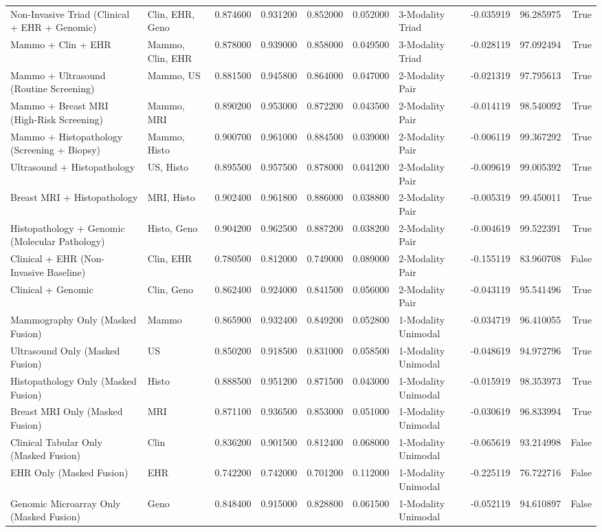 \begin{tabular}{llrrrrlrrr}
Non-Invasive Triad (Clinical + EHR + Genomic) & Clin, EHR, Geno & 0.874600 & 0.931200 & 0.852000 & 0.052000 & 3-Modality Triad & -0.035919 & 96.285975 & True \\
Mammo + Clin + EHR & Mammo, Clin, EHR & 0.878000 & 0.939000 & 0.858000 & 0.049500 & 3-Modality Triad & -0.028119 & 97.092494 & True \\
Mammo + Ultrasound (Routine Screening) & Mammo, US & 0.881500 & 0.945800 & 0.864000 & 0.047000 & 2-Modality Pair & -0.021319 & 97.795613 & True \\
Mammo + Breast MRI (High-Risk Screening) & Mammo, MRI & 0.890200 & 0.953000 & 0.872200 & 0.043500 & 2-Modality Pair & -0.014119 & 98.540092 & True \\
Mammo + Histopathology (Screening + Biopsy) & Mammo, Histo & 0.900700 & 0.961000 & 0.884500 & 0.039000 & 2-Modality Pair & -0.006119 & 99.367292 & True \\
Ultrasound + Histopathology & US, Histo & 0.895500 & 0.957500 & 0.878000 & 0.041200 & 2-Modality Pair & -0.009619 & 99.005392 & True \\
Breast MRI + Histopathology & MRI, Histo & 0.902400 & 0.961800 & 0.886000 & 0.038800 & 2-Modality Pair & -0.005319 & 99.450011 & True \\
Histopathology + Genomic (Molecular Pathology) & Histo, Geno & 0.904200 & 0.962500 & 0.887200 & 0.038200 & 2-Modality Pair & -0.004619 & 99.522391 & True \\
Clinical + EHR (Non-Invasive Baseline) & Clin, EHR & 0.780500 & 0.812000 & 0.749000 & 0.089000 & 2-Modality Pair & -0.155119 & 83.960708 & False \\
Clinical + Genomic & Clin, Geno & 0.862400 & 0.924000 & 0.841500 & 0.056000 & 2-Modality Pair & -0.043119 & 95.541496 & True \\
Mammography Only (Masked Fusion) & Mammo & 0.865900 & 0.932400 & 0.849200 & 0.052800 & 1-Modality Unimodal & -0.034719 & 96.410055 & True \\
Ultrasound Only (Masked Fusion) & US & 0.850200 & 0.918500 & 0.831000 & 0.058500 & 1-Modality Unimodal & -0.048619 & 94.972796 & True \\
Histopathology Only (Masked Fusion) & Histo & 0.888500 & 0.951200 & 0.871500 & 0.043000 & 1-Modality Unimodal & -0.015919 & 98.353973 & True \\
Breast MRI Only (Masked Fusion) & MRI & 0.871100 & 0.936500 & 0.853000 & 0.051000 & 1-Modality Unimodal & -0.030619 & 96.833994 & True \\
Clinical Tabular Only (Masked Fusion) & Clin & 0.836200 & 0.901500 & 0.812400 & 0.068000 & 1-Modality Unimodal & -0.065619 & 93.214998 & False \\
EHR Only (Masked Fusion) & EHR & 0.742200 & 0.742000 & 0.701200 & 0.112000 & 1-Modality Unimodal & -0.225119 & 76.722716 & False \\
Genomic Microarray Only (Masked Fusion) & Geno & 0.848400 & 0.915000 & 0.828800 & 0.061500 & 1-Modality Unimodal & -0.052119 & 94.610897 & False \\
\bottomrule
\end{tabular}
